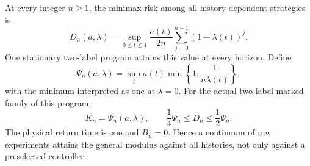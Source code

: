 \begin{theorem}\label{thm:profile}
At every integer $n\ge1$, the minimax risk among all history-dependent strategies is
\begin{equation}\label{eq:profile-exact}
 D_n(a,\lambda)=\sup_{0\le t\le1}
       \frac{a(t)}{2n}\sum_{j=0}^{n-1}(1-\lambda(t))^j.
\end{equation}
One stationary two-label program attains this value at every horizon. Define
\begin{equation}\label{eq:profile-psi}
 \Psi_n(a,\lambda)=\sup_t a(t)
       \min\left\{1,\frac1{n\lambda(t)}\right\},
\end{equation}
with the minimum interpreted as one at $\lambda=0$. For the actual two-label marked family of this program,
\begin{equation}\label{eq:profile-modulus}
 K_n=\Psi_n(a,\lambda),\qquad
 \frac14\Psi_n\le D_n\le\frac12\Psi_n.
\end{equation}
The physical return time is one and $B_n=0$. Hence a continuum of raw experiments attains the general modulus against all histories, not only against a preselected controller.
\end{theorem}
